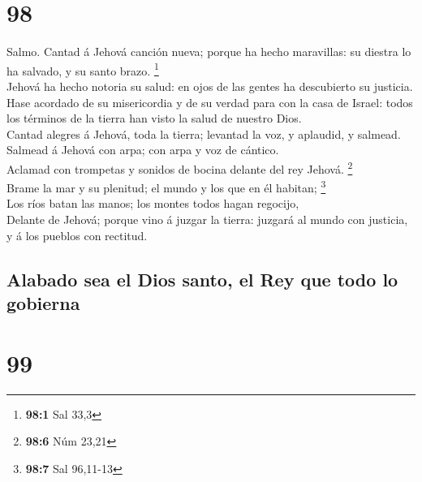 \hypertarget{section-97}{%
\section{98}\label{section-97}}

 Salmo. Cantad á Jehová canción nueva; porque ha hecho
maravillas: su diestra lo ha salvado, y su santo brazo. \footnote{\textbf{98:1}
  Sal 33,3}\\
 Jehová ha hecho notoria su salud: en ojos de las gentes
ha descubierto su justicia.\\
 Hase acordado de su misericordia y de su verdad para con
la casa de Israel: todos los términos de la tierra han visto la salud de
nuestro Dios.\\
 Cantad alegres á Jehová, toda la tierra; levantad la voz,
y aplaudid, y salmead.\\
 Salmead á Jehová con arpa; con arpa y voz de cántico.\\
 Aclamad con trompetas y sonidos de bocina delante del rey
Jehová. \footnote{\textbf{98:6} Núm 23,21}\\
 Brame la mar y su plenitud; el mundo y los que en él
habitan; \footnote{\textbf{98:7} Sal 96,11-13}\\
 Los ríos batan las manos; los montes todos hagan
regocijo,\\
 Delante de Jehová; porque vino á juzgar la tierra:
juzgará al mundo con justicia, y á los pueblos con rectitud.

\hypertarget{alabado-sea-el-dios-santo-el-rey-que-todo-lo-gobierna}{%
\subsection{Alabado sea el Dios santo, el Rey que todo lo
gobierna}\label{alabado-sea-el-dios-santo-el-rey-que-todo-lo-gobierna}}

\hypertarget{section-98}{%
\section{99}\label{section-98}}

